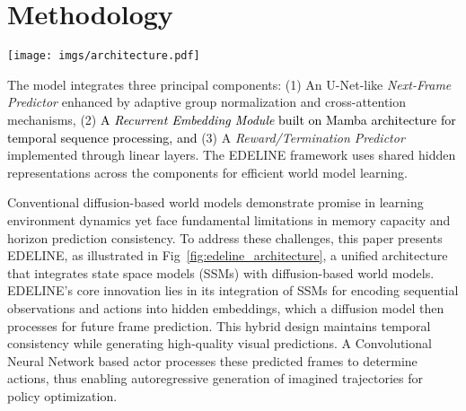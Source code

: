 \section{Methodology}

\begin{figure*}[t]
\begin{minipage}{0.63\textwidth}
\centering
\texttt{[image: imgs/architecture.pdf]}
\label{fig:edeline_architecture}
\end{minipage}
\hfill
\begin{minipage}{0.35\textwidth}
\vspace{-2em}
\caption{\textbf{Framework Overview of EDELINE.}} 
      The model integrates three principal components: 
      (1) An U-Net-like \textit{Next-Frame Predictor} enhanced by adaptive group normalization and cross-attention mechanisms,
      (2) \textcolor{black}{A \textit{Recurrent Embedding Module} built on Mamba architecture for temporal sequence processing, and}
      (3) A \textit{Reward/Termination Predictor} implemented through linear layers. The EDELINE framework uses shared hidden representations across the components for efficient world model learning.
\end{minipage}\vspace{-1em}
\end{figure*}

Conventional diffusion-based world models \cite{alonso2024diamond} demonstrate promise in learning environment dynamics yet face fundamental limitations in memory capacity and horizon prediction consistency. To address these challenges, this paper presents EDELINE, as illustrated in Fig~\ref{fig:edeline_architecture}, a unified architecture that integrates state space models (SSMs) with diffusion-based world models. EDELINE's core innovation lies in its integration of SSMs for encoding sequential observations and actions into hidden embeddings, which a diffusion model then processes for future frame prediction. This hybrid design maintains temporal consistency while generating high-quality visual predictions. A Convolutional Neural Network based actor processes these predicted frames to determine actions, thus enabling autoregressive generation of imagined trajectories for policy optimization.

